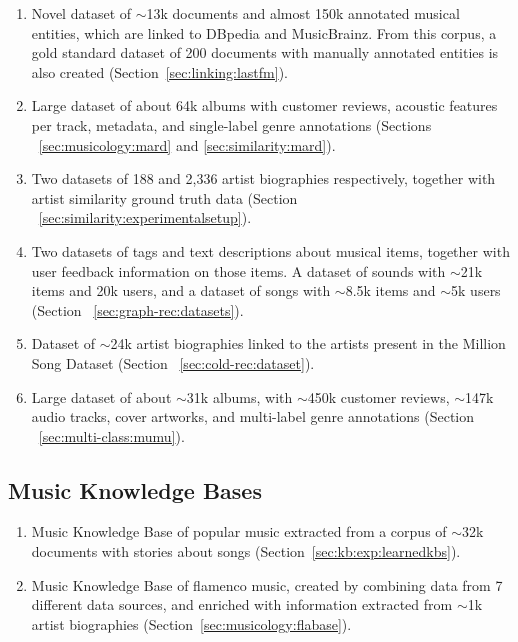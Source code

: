 \begin{enumerate}

\item 
Novel dataset of $\sim$13k documents and almost 150k annotated musical entities, which are linked to DBpedia and MusicBrainz. From this corpus, a gold standard dataset of 200 documents with manually annotated entities is also created (Section~\ref{sec:linking:lastfm}).

\item
Large dataset of about 64k albums with customer reviews, acoustic features per track, metadata, and single-label genre annotations (Sections ~\ref{sec:musicology:mard} and \ref{sec:similarity:mard}).

\item
Two datasets of 188 and 2,336 artist biographies respectively, together with artist similarity ground truth data (Section ~\ref{sec:similarity:experimentalsetup}).

\item
Two datasets of tags and text descriptions about musical items, together with user feedback information on those items. A dataset of sounds with $\sim$21k items and 20k users, and a dataset of songs with $\sim$8.5k items and $\sim$5k users (Section ~\ref{sec:graph-rec:datasets}).

\item
Dataset of $\sim$24k artist biographies linked to the artists present in the Million Song Dataset (Section ~\ref{sec:cold-rec:dataset}).

\item
Large dataset of about $\sim$31k albums, with $\sim$450k customer reviews, $\sim$147k audio tracks, cover artworks, and multi-label genre annotations (Section ~\ref{sec:multi-class:mumu}).

\end{enumerate}

\subsection{Music Knowledge Bases}

\begin{enumerate}
\item
Music Knowledge Base of popular music extracted from a corpus of $\sim$32k documents with stories about songs (Section~\ref{sec:kb:exp:learnedkbs}).

\item
Music Knowledge Base of flamenco music, created by combining data from 7 different data sources, and enriched with information extracted from $\sim$1k artist biographies (Section~\ref{sec:musicology:flabase}).

\end{enumerate}

